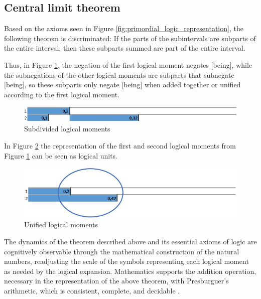 \subsection{Central limit theorem}
Based on the axioms seen in Figure \ref{fig:primordial_logic_representation}, the following theorem is discriminated: If the parts of the subintervals are subparts of the entire interval, then these subparts summed are part of the entire interval.

Thus, in Figure \ref{fig:second_logical_moment}, the negation of the first logical moment negates [being], while the subnegations of the other logical moments are subparts that subnegate [being], so these subparts only negate [being] when added together or unified according to the first logical moment.
	\begin{figure}[H]
	\caption{Subdivided logical moments}
	\label{fig:second_logical_moment}
	\centering
	\includegraphics[scale=.8]{sections/images/second_logical_moment.jpg}
	\end{figure}

In Figure \ref{fig:logical_units} the representation of the first and second logical moments from Figure \ref{fig:second_logical_moment} can be seen as logical units.
	\begin{figure}[H]
	\caption{Unified logical moments}
	\label{fig:logical_units}
	\centering
	\includegraphics[scale=.8]{sections/images/logical_units.jpg}
	\end{figure}

The dynamics of the theorem described above and its essential axioms of logic are cognitively observable through the mathematical construction of the natural numbers, readjusting the scale of the symbols representing each logical moment as needed by the logical expansion. Mathematics supports the addition operation, necessary in the representation of the above theorem, with Presburguer's arithmetic, which is consistent, complete, and decidable \cite{wiki_arithmetic_presburger}.

